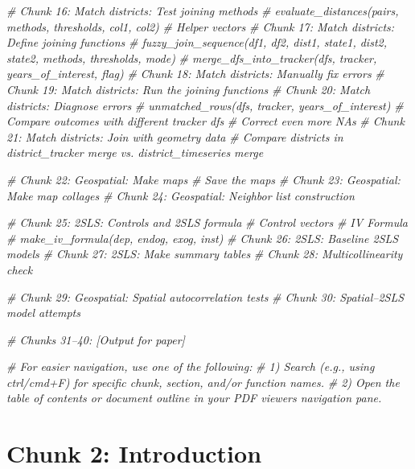 \documentclass[
]{article}
\newenvironment{Shaded}{\begin{snugshade}}{\end{snugshade}}
\newcommand{\CommentTok}[1]{\textcolor[rgb]{0.56,0.35,0.01}{\textit{#1}}}
\begin{document}
\begin{Shaded}
\begin{Highlighting}[]
\CommentTok{\# Chunk 16: Match districts: Test joining methods}
  \CommentTok{\# evaluate\_distances(pairs, methods, thresholds, col1, col2)}
  \CommentTok{\# Helper vectors}
\CommentTok{\# Chunk 17: Match districts: Define joining functions}
  \CommentTok{\# fuzzy\_join\_sequence(df1, df2, dist1, state1, dist2, state2, methods, thresholds, mode)}
  \CommentTok{\# merge\_dfs\_into\_tracker(dfs, tracker, years\_of\_interest, flag)}
\CommentTok{\# Chunk 18: Match districts: Manually fix errors}
\CommentTok{\# Chunk 19: Match districts: Run the joining functions}
\CommentTok{\# Chunk 20: Match districts: Diagnose errors}
  \CommentTok{\# unmatched\_rows(dfs, tracker, years\_of\_interest)}
  \CommentTok{\# Compare outcomes with different tracker dfs}
  \CommentTok{\# Correct even more NAs}
\CommentTok{\# Chunk 21: Match districts: Join with geometry data}
  \CommentTok{\# Compare districts in district\_tracker merge vs. district\_timeseries merge}

\CommentTok{\# Chunk 22: Geospatial: Make maps}
  \CommentTok{\# Save the maps}
\CommentTok{\# Chunk 23: Geospatial: Make map collages}
\CommentTok{\# Chunk 24: Geospatial: Neighbor list construction}

\CommentTok{\# Chunk 25: 2SLS: Controls and 2SLS formula}
  \CommentTok{\# Control vectors}
  \CommentTok{\# IV Formula}
    \CommentTok{\# make\_iv\_formula(dep, endog, exog, inst)}
\CommentTok{\# Chunk 26: 2SLS: Baseline 2SLS models}
\CommentTok{\# Chunk 27: 2SLS: Make summary tables}
\CommentTok{\# Chunk 28: Multicollinearity check}

\CommentTok{\# Chunk 29: Geospatial: Spatial autocorrelation tests}
\CommentTok{\# Chunk 30: Spatial–2SLS model attempts}

\CommentTok{\# Chunks 31–40: [Output for paper]}


\CommentTok{\# For easier navigation, use one of the following:}
\CommentTok{\# 1) Search (e.g., using ctrl/cmd+F) for specific chunk, section, and/or function names.}
\CommentTok{\# 2) Open the table of contents or document outline in your PDF viewer\textquotesingle{}s navigation pane.}
\end{Highlighting}
\end{Shaded}

\section*{Chunk 2: Introduction}\label{chunk-2-introduction}
\end{document}
